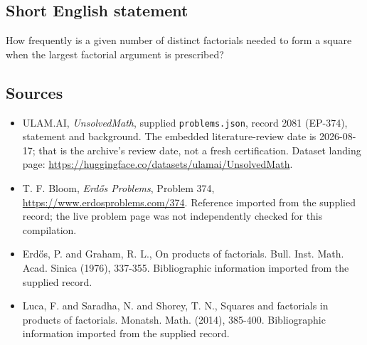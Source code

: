 \documentclass[11pt,a4paper]{article}
\begin{document}
\subsection{Short English statement}

How frequently is a given number of distinct factorials needed to form a square when the largest factorial argument is prescribed?

\subsection{Sources}

{\small

\begin{itemize}

\item[\hypertarget{source:2081:1}{S1}] ULAM.AI, \emph{UnsolvedMath}, supplied \texttt{problems.json}, record 2081 (EP-374), statement and background. The embedded literature-review date is 2026-08-17; that is the archive’s review date, not a fresh certification. Dataset landing page: \url{https://huggingface.co/datasets/ulamai/UnsolvedMath}.

\item[\hypertarget{source:2081:2}{S2}] T. F. Bloom, \emph{Erdős Problems}, Problem 374, \url{https://www.erdosproblems.com/374}. Reference imported from the supplied record; the live problem page was not independently checked for this compilation.

\item[\hypertarget{source:2081:3}{S3}] Erd\H{o}s, P. and Graham, R. L., On products of factorials. Bull. Inst. Math. Acad. Sinica (1976), 337-355. Bibliographic information imported from the supplied record.

\item[\hypertarget{source:2081:4}{S4}] Luca, F. and Saradha, N. and Shorey, T. N., Squares and factorials in products of factorials. Monatsh. Math. (2014), 385-400. Bibliographic information imported from the supplied record.

\end{itemize}

}

\label{end:2081}
\end{document}
